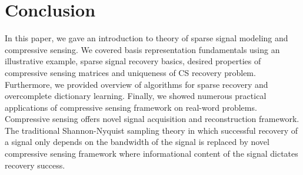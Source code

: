 \documentclass[journal]{IEEEtran}
\begin{document}
%




\section{Conclusion} \label{sec:6}

In this paper, we gave an introduction to theory of sparse signal modeling and compressive sensing. We covered basis representation fundamentals using an illustrative example, sparse signal recovery basics, desired properties of compressive sensing matrices and uniqueness of CS recovery problem. Furthermore, we provided overview of algorithms for sparse recovery and overcomplete dictionary learning. Finally, we showed numerous practical applications of compressive sensing framework on real-word problems. Compressive sensing offers novel signal acquisition and reconstruction framework. The traditional Shannon-Nyquist sampling theory in which successful recovery of a signal only depends on the bandwidth of the signal is replaced by novel compressive sensing framework where informational content of the signal dictates recovery success.
\end{document}
